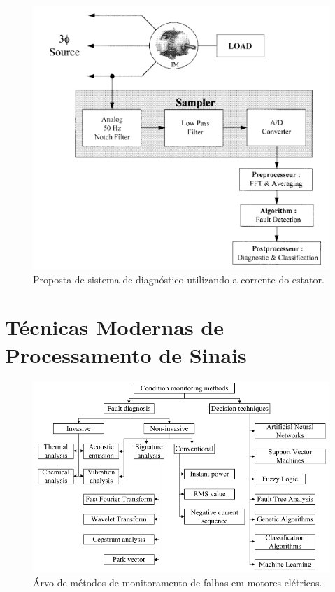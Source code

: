 \begin{figure}[H]
    \caption{Proposta de sistema de diagnóstico utilizando a corrente do estator.}
    \begin{center}
        \includegraphics[scale=.5]{referencial/img/current_benbouzid_p3.png}
    \end{center}
    \label{fig:current_benbouzid_p3}
\end{figure}


% 

\section{Técnicas Modernas de Processamento de Sinais}\label{sec:}


\begin{figure}[H]
    \caption{Árvo de métodos de monitoramento de falhas em motores elétricos.}
    \begin{center}
        \includegraphics[scale=.5]{referencial/img/monitoring_methods_rilski_p78.png}
    \end{center}
    \label{fig:monitoring_methods_rilski_p78}
\end{figure}

